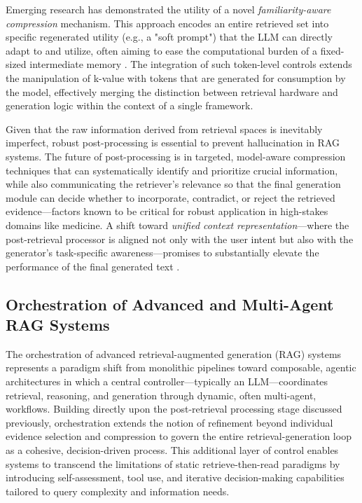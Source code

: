 \documentclass[11pt,a4paper]{article}
\begin{document}
Emerging research has demonstrated the utility of a novel \emph{familiarity-aware compression} mechanism. This approach encodes an entire retrieved set into specific regenerated utility (e.g., a "soft prompt") that the LLM can directly adapt to and utilize, often aiming to ease the computational burden of a fixed-sized intermediate memory \cite{arxiv:2405.03085v1}. The integration of such token-level controls extends the manipulation of k-value with tokens that are generated for consumption by the model, effectively merging the distinction between retrieval hardware and generation logic within the context of a single framework.

Given that the raw information derived from retrieval spaces is inevitably imperfect, robust post-processing is essential to prevent hallucination in RAG systems. The future of post-processing is in targeted, model-aware compression techniques that can systematically identify and prioritize crucial information, while also communicating the retriever's relevance so that the final generation module can decide whether to incorporate, contradict, or reject the retrieved evidence---factors known to be critical for robust application in high-stakes domains like medicine. A shift toward \emph{unified context representation}---where the post-retrieval processor is aligned not only with the user intent but also with the generator's task-specific awareness---promises to substantially elevate the performance of the final generated text \cite{arxiv:2405.06683v1}.


\subsection{Orchestration of Advanced and Multi-Agent RAG Systems}


The orchestration of advanced retrieval-augmented generation (RAG) systems represents a paradigm shift from monolithic pipelines toward composable, agentic architectures in which a central controller---typically an LLM---coordinates retrieval, reasoning, and generation through dynamic, often multi-agent, workflows. Building directly upon the post-retrieval processing stage discussed previously, orchestration extends the notion of refinement beyond individual evidence selection and compression to govern the entire retrieval-generation loop as a cohesive, decision-driven process. This additional layer of control enables systems to transcend the limitations of static retrieve-then-read paradigms by introducing self-assessment, tool use, and iterative decision-making capabilities tailored to query complexity and information needs.
\end{document}
